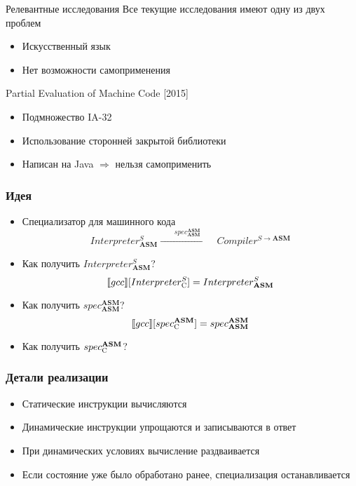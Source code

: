 \documentclass[demo]{beamer}
\begin{document}
\begin{frame}{Релевантные исследования}
  Все текущие исследования имеют одну из двух проблем
  \begin{itemize}
  \item Искусственный язык
    \vfill
  \item Нет возможности самоприменения
  \end{itemize}
  \vfill
  Partial Evaluation of Machine Code \hfill [2015]
    \begin{itemize}
    \item Подмножество IA-32
    \vfill
    \item Использование сторонней закрытой библиотеки
    \vfill
    \item \large Написан на Java $\Rightarrow$ нельзя самоприменить
  	\end{itemize}
\end{frame}

\begin{frame}\frametitle{Идея}
  \begin{itemize}
  \item {Специализатор для машинного кода
      $$Interpreter^{S}_{\mathbf{ASM}}
      \xrightarrow{\qquad spec^{ \mathbf{ASM}}_{\mathbf{ASM}}\qquad} Compiler^{S \to \mathbf{ASM}}$$
    }
    \vfill
  \item {Как получить $Interpreter^{S}_{\mathbf{ASM}}$?
      $$\llbracket gcc \rrbracket [Interpreter^{S}_{\textsc{C}}] =
      Interpreter^{S}_{\mathbf{ASM}}$$}
    \vfill
  \item {Как получить $spec^{\mathbf{ASM}}_{\mathbf{ASM}}$?
      $$\llbracket gcc \rrbracket [spec^{ \mathbf{ASM}}_{\textsc{C}}] =
      spec^{\mathbf{ASM}}_{\mathbf{ASM}}$$}
    \vfill
  \item{Как получить $spec^{\mathbf{ASM}}_{\textsc{C}}$?
      }
    \vfill
  \end{itemize}
\end{frame}

\begin{frame}\frametitle{Детали реализации}
\begin{itemize}
\item Статические инструкции вычисляются
\vfill
\item Динамические инструкции упрощаются и записываются в ответ
\vfill
\item При динамических условиях вычисление раздваивается
\vfill
\item Если состояние уже было обработано ранее, специализация останавливается
\end{itemize}

\end{frame}
\end{document}
